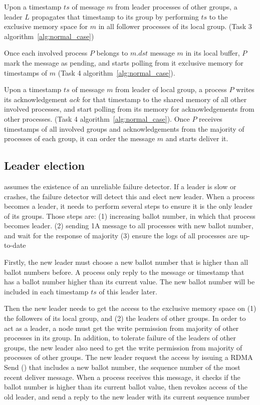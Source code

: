 Upon \lread a timestamp $ts$ of message $m$ from leader processes of other
groups, a leader $L$ propagates that timestamp to its group by performing
\rwrite $ts$ to the exclusive memory space for $m$ in all follower processes of
its local group. (Task 3 algorithm~\ref{alg:normal_case})

Once each involved process $P$ belongs to $m.dst$ \lread message $m$ in its
local buffer, $P$ mark the message as pending, and starts polling from it
exclusive memory for timestamps of $m$ (Task 4 algorithm~\ref{alg:normal_case}).

Upon \lread a timestamp $ts$ of message $m$ from leader of local group, a
process $P$ writes its acknowledgement $ack$ for that timestamp to the shared
memory of all other involved processes, and start polling from its memory for
acknowledgements from other processes. (Task 4 algorithm~\ref{alg:normal_case}).
Once $P$ receives timestamps of all involved groups and acknowledgements from
the majority of processes of each group, it can order the message $m$ and starts
deliver it.

\subsection{Leader election}

\proto assumes the existence of an unreliable failure detector. If a leader is
slow or crashes, the failure detector will detect this and elect new leader.
When a process becomes a leader, it needs to perform several steps to ensure it
is the only leader of its groups. Those steps are: (1) increasing ballot number,
in which that process becomes leader. (2) sending 1A message to all processes
with new ballot number, and wait for the response of majority (3) ensure the
logs of all processes are up-to-date

Firstly, the new leader must choose a new ballot number that is higher than all
ballot numbers before. A process only reply to the message or timestamp that has
a ballot number higher than its current value. The new ballot number will be
included in each timestamp $ts$ of this leader later.

Then the new leader needs to get the access to the exclusive memory space on (1)
the followers of its local group, and (2) the leaders of other groups. In order
to act as a leader, a node must get the write permission from majority of other
processes in its group. In addition, to tolerate failure of the leaders of other
groups, the new leader also need to get the write permission from majority of
processes of other groups. The new leader request the access by issuing a RDMA
Send () that includes a new ballot number, the
sequence number of the most recent deliver message. When a process receives this
message, it checks if the ballot number is higher than its current ballot value,
then revokes access of the old leader, and send a reply to the new leader with
its current sequence number

